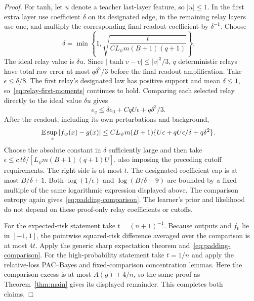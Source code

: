 \begin{proof}
For tanh, let $u$ denote a teacher last-layer feature, so $|u|\le1$.
In the first extra layer use coefficient $\delta$ on its designated edge, in the remaining relay layers use one, and multiply the corresponding final readout coefficient by $\delta^{-1}$. Choose
\[
 \delta=\min\left\{1,\sqrt{\frac{t}{C L_\psi m(B+1)(q+1)}}\right\}.
\]
The ideal relay value is $\delta u$. Since
$|\tanh v-v|\le|v|^3/3$, $q$ deterministic relays have total raw error at most
$q\delta^3/3$ before the final readout amplification.
Take $\epsilon\le\delta/8$. The first relay's designated law has positive support and mean $\delta\le1$, so~\eqref{eq:relay-first-moments} continues to hold. Comparing each selected relay directly to the ideal value $\delta u$ gives
\[
 e_q\le\delta e_0+CqU\epsilon+q\delta^3/3.
\]
After the readout, including its own perturbations and background,
\[
 \mathbb E\sup_x|f_w(x)-g(x)|
 \le C L_\psi m(B+1)
       \{U\epsilon+qU\epsilon/\delta+q\delta^2\}.
\]
Choose the absolute constant in $\delta$ sufficiently large and then take
$\epsilon\le c\,t\delta/[L_\psi m(B+1)(q+1)U]$, also imposing the preceding cutoff requirements. The right side is at most $t$.
The designated coefficient cap is at most $B/\delta+1$. Both
$\log(1/\epsilon)$ and $\log(B/\delta+9)$ are bounded by a fixed multiple of the same logarithmic expression displayed above. The comparison entropy again gives~\eqref{eq:padding-comparison}. The learner's prior and likelihood do not depend on these proof-only relay coefficients or cutoffs.

For the expected-risk statement take $t=(n+1)^{-1}$.
Because outputs and $f_0$ lie in $[-1,1]$, the pointwise squared-risk difference averaged over the comparison is at most $4t$. Apply the generic sharp expectation theorem and~\eqref{eq:padding-comparison}.
For the high-probability statement take $t=1/n$ and apply the relative-loss PAC--Bayes and fixed-comparison concentration lemmas. Here the comparison excess is at most $A(g)+4/n$, so the same proof as Theorem~\ref{thm:main} gives its displayed remainder. This completes both claims.
\end{proof}
